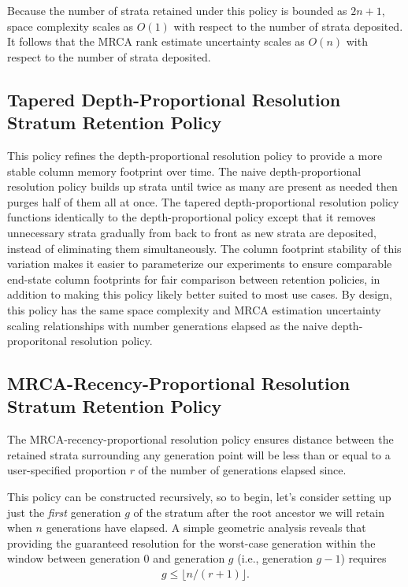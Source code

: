 Because the number of strata retained under this policy is bounded as $2n+1$, space complexity scales as $O(1)$ with respect to the number of strata deposited.
It follows that the MRCA rank estimate uncertainty scales as $O(n)$ with respect to the number of strata deposited.

\subsection{Tapered Depth-Proportional Resolution Stratum Retention Policy}

This policy refines the depth-proportional resolution policy to provide a more stable column memory footprint over time.
The naive depth-proportional resolution policy builds up strata until twice as many are present as needed then purges half of them all at once.
The tapered depth-proportional resolution policy functions identically to the depth-proportional policy except that it removes unnecessary strata gradually from back to front as new strata are deposited, instead of eliminating them simultaneously.
The column footprint stability of this variation makes it easier to parameterize our experiments to ensure comparable end-state column footprints for fair comparison between retention policies, in addition to making this policy likely better suited to most use cases.
By design, this policy has the same space complexity and MRCA estimation uncertainty scaling relationships with number generations elapsed as the naive depth-proporitonal resolution policy.

\subsection{MRCA-Recency-Proportional Resolution Stratum Retention Policy}



The MRCA-recency-proportional resolution policy ensures distance between the retained strata surrounding any generation point will be less than or equal to a user-specified proportion $r$ of the number of generations elapsed since.

This policy can be constructed recursively, so to begin, let's consider setting up just the \textit{first} generation $g$ of the stratum after the root ancestor we will retain when $n$ generations have elapsed.
A simple geometric analysis reveals that providing the guaranteed resolution for the worst-case generation within the window between generation 0 and generation $g$ (i.e., generation $g-1$) requires
\begin{align*}
  g \leq \lfloor n / (r + 1) \rfloor.
\end{align*}

